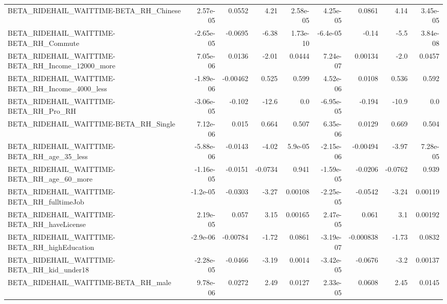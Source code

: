 \begin{tabular}{lrrrrrrrr}
BETA\_RIDEHAIL\_WAITTIME-BETA\_RH\_Chinese             &    2.57e-05 &       0.0552 &      4.21 & 2.58e-05 &   4.25e-05 &      0.0861 &         4.14 &      3.45e-05 \\
BETA\_RIDEHAIL\_WAITTIME-BETA\_RH\_Commute             &   -2.65e-05 &      -0.0695 &     -6.38 & 1.73e-10 &   -6.4e-05 &       -0.14 &         -5.5 &      3.84e-08 \\
BETA\_RIDEHAIL\_WAITTIME-BETA\_RH\_Income\_12000\_more   &    7.05e-06 &       0.0136 &     -2.01 &   0.0444 &   7.24e-07 &     0.00134 &         -2.0 &        0.0457 \\
BETA\_RIDEHAIL\_WAITTIME-BETA\_RH\_Income\_4000\_less    &   -1.89e-06 &     -0.00462 &     0.525 &    0.599 &   4.52e-06 &      0.0108 &        0.536 &         0.592 \\
BETA\_RIDEHAIL\_WAITTIME-BETA\_RH\_Pro\_RH              &   -3.06e-05 &       -0.102 &     -12.6 &      0.0 &  -6.95e-05 &      -0.194 &        -10.9 &           0.0 \\
BETA\_RIDEHAIL\_WAITTIME-BETA\_RH\_Single              &    7.12e-06 &        0.015 &     0.664 &    0.507 &   6.35e-06 &      0.0129 &        0.669 &         0.504 \\
BETA\_RIDEHAIL\_WAITTIME-BETA\_RH\_age\_35\_less         &   -5.88e-06 &      -0.0143 &     -4.02 &  5.9e-05 &  -2.15e-06 &    -0.00494 &        -3.97 &      7.28e-05 \\
BETA\_RIDEHAIL\_WAITTIME-BETA\_RH\_age\_60\_more         &   -1.16e-05 &      -0.0151 &   -0.0734 &    0.941 &  -1.59e-05 &     -0.0206 &      -0.0762 &         0.939 \\
BETA\_RIDEHAIL\_WAITTIME-BETA\_RH\_fulltimeJob         &    -1.2e-05 &      -0.0303 &     -3.27 &  0.00108 &  -2.25e-05 &     -0.0542 &        -3.24 &       0.00119 \\
BETA\_RIDEHAIL\_WAITTIME-BETA\_RH\_haveLicense         &    2.19e-05 &        0.057 &      3.15 &  0.00165 &   2.47e-05 &       0.061 &          3.1 &       0.00192 \\
BETA\_RIDEHAIL\_WAITTIME-BETA\_RH\_highEducation       &    -2.9e-06 &     -0.00784 &     -1.72 &   0.0861 &  -3.19e-07 &   -0.000838 &        -1.73 &        0.0832 \\
BETA\_RIDEHAIL\_WAITTIME-BETA\_RH\_kid\_under18         &   -2.28e-05 &      -0.0466 &     -3.19 &   0.0014 &  -3.42e-05 &     -0.0676 &         -3.2 &       0.00137 \\
BETA\_RIDEHAIL\_WAITTIME-BETA\_RH\_male                &    9.78e-06 &       0.0272 &      2.49 &   0.0127 &   2.33e-05 &      0.0608 &         2.45 &        0.0145 \\

\end{tabular}
